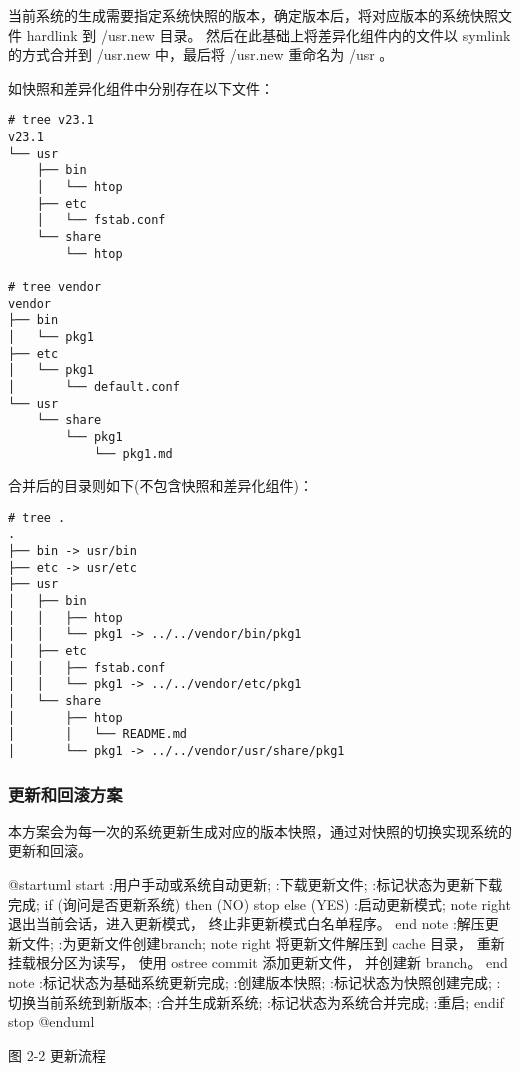 \documentclass{utart}
\begin{document}
当前系统的生成需要指定系统快照的版本，确定版本后，将对应版本的系统快照文件 hardlink 到 /usr.new 目录。
然后在此基础上将差异化组件内的文件以 symlink 的方式合并到 /usr.new 中，最后将 /usr.new 重命名为 /usr 。

如快照和差异化组件中分别存在以下文件：
\begin{verbatim}
# tree v23.1
v23.1
└── usr
    ├── bin
    │   └── htop
    ├── etc
    │   └── fstab.conf
    └── share
        └── htop

# tree vendor
vendor
├── bin
│   └── pkg1
├── etc
│   └── pkg1
│       └── default.conf
└── usr
    └── share
        └── pkg1
            └── pkg1.md
\end{verbatim}

合并后的目录则如下(不包含快照和差异化组件)：
\begin{verbatim}
# tree .
.
├── bin -> usr/bin
├── etc -> usr/etc
├── usr
│   ├── bin
│   │   ├── htop
│   │   └── pkg1 -> ../../vendor/bin/pkg1
│   ├── etc
│   │   ├── fstab.conf
│   │   └── pkg1 -> ../../vendor/etc/pkg1
│   └── share
│       ├── htop
│       │   └── README.md
│       └── pkg1 -> ../../vendor/usr/share/pkg1
\end{verbatim}

\subsubsection{更新和回滚方案}
本方案会为每一次的系统更新生成对应的版本快照，通过对快照的切换实现系统的更新和回滚。

\begin{center}
  \begin{adjustbox}{scale=0.55}
    \begin{plantuml}
      @startuml
      start
      :用户手动或系统自动更新;
      :下载更新文件;
      :标记状态为更新下载完成;
      if (询问是否更新系统) then (NO)
      stop
      else (YES)
      :启动更新模式;
      note right
      退出当前会话，进入更新模式，
      终止非更新模式白名单程序。
      end note
      :解压更新文件;
      :为更新文件创建branch;
      note right
      将更新文件解压到 cache 目录，
      重新挂载根分区为读写，
      使用 ostree commit 添加更新文件，
      并创建新 branch。
      end note
      :标记状态为基础系统更新完成;
      :创建版本快照;
      :标记状态为快照创建完成;
      :切换当前系统到新版本;
      :合并生成新系统;
      :标记状态为系统合并完成;
      :重启;
      endif
      stop
      @enduml
    \end{plantuml}
  \end{adjustbox}

  图 2-2 更新流程
\end{center}
\end{document}

